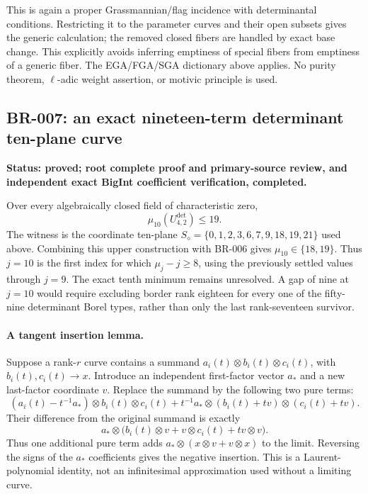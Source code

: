 This is again a proper Grassmannian/flag incidence with determinantal
conditions.  Restricting it to the parameter curves and their open
subsets gives the generic calculation; the removed closed fibers are
handled by exact base change.  This explicitly avoids inferring
emptiness of special fibers from emptiness of a generic fiber.
The EGA/FGA/SGA dictionary above applies.  No purity theorem,
$\ell$-adic weight assertion, or motivic principle is used.

\subsection*{BR-007: an exact nineteen-term determinant ten-plane curve}
\textbf{Status: proved; root complete proof and primary-source review,
and independent exact BigInt coefficient verification, completed.}

Over every algebraically closed field of characteristic zero,
\[
 \mu_{10}(U^{\mathrm{det}}_{4,2})\le19.
\]
The witness is the coordinate ten-plane
$S_\diamond=\{0,1,2,3,6,7,9,18,19,21\}$ used above.
Combining this upper construction with BR-006 gives
$\mu_{10}\in\{18,19\}$.  Thus $j=10$ is the first index for which
$\mu_j-j\ge8$, using the previously settled values through $j=9$.
The exact tenth minimum remains unresolved.  A gap of nine at $j=10$
would require excluding border rank eighteen for every one of the
fifty-nine determinant Borel types, rather than only the last
rank-seventeen survivor.

\paragraph{A tangent insertion lemma.}
Suppose a rank-$r$ curve contains a summand
$a_i(t)\otimes b_i(t)\otimes c_i(t)$, with
$b_i(t),c_i(t)\longrightarrow x$.  Introduce an independent first-factor
vector $a_\ast$ and a new last-factor coordinate $v$.  Replace the summand
by the following two pure terms:
\[
 (a_i(t)-t^{-1}a_\ast)\otimes b_i(t)\otimes c_i(t)
 +t^{-1}a_\ast\otimes(b_i(t)+tv)\otimes(c_i(t)+tv).
\]
Their difference from the original summand is exactly
\[
 a_\ast\otimes\bigl(b_i(t)\otimes v+v\otimes c_i(t)
                      +t v\otimes v\bigr).
\]
Thus one additional pure term adds
$a_\ast\otimes(x\otimes v+v\otimes x)$ to the limit.
Reversing the signs of the $a_\ast$ coefficients gives the negative
insertion.  This is a Laurent-polynomial identity, not an infinitesimal
approximation used without a limiting curve.

